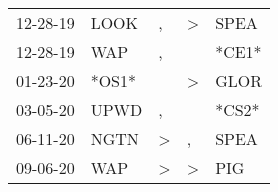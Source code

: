 \begin{supertabular}{p{0.07\textwidth}p{0.06\textwidth}p{0.02\textwidth}p{0.02\textwidth}p{0.06\textwidth}}
          12-28-19\textsuperscript{} &           LOOK\textsuperscript{} &                , &     \textgreater &           SPEA\textsuperscript{} \\
          12-28-19\textsuperscript{} &            WAP\textsuperscript{} &                , &                  &                            *CE1* \\
          01-23-20\textsuperscript{} &                            *OS1* &                  &     \textgreater &           GLOR\textsuperscript{} \\
          03-05-20\textsuperscript{} &           UPWD\textsuperscript{} &                , &                  &                            *CS2* \\
          06-11-20\textsuperscript{} &           NGTN\textsuperscript{} &     \textgreater &                , &           SPEA\textsuperscript{} \\
          09-06-20\textsuperscript{} &            WAP\textsuperscript{} &     \textgreater &     \textgreater &            PIG\textsuperscript{} \\
\end{supertabular}
